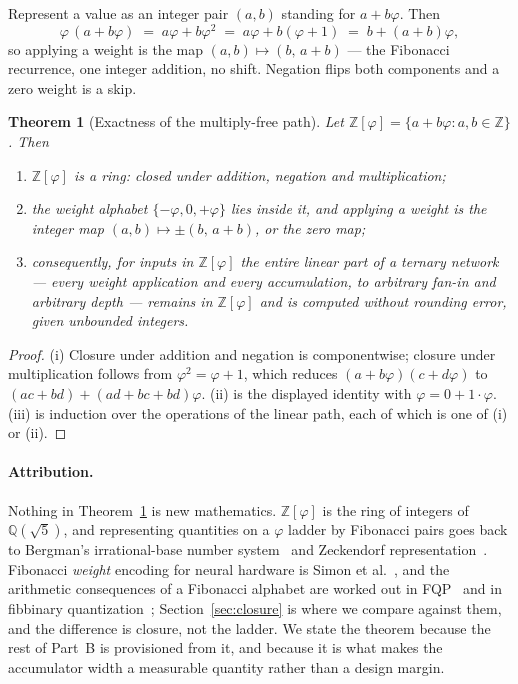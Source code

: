 \documentclass[11pt]{article}
\newtheorem{theorem}{Theorem}
\theoremstyle{definition}
\begin{document}
Represent a value as an integer pair $(a,b)$ standing for $a + b\varphi$. Then
\[
  \varphi\,(a + b\varphi) \;=\; a\varphi + b\varphi^{2} \;=\; a\varphi + b(\varphi+1)
  \;=\; b + (a+b)\varphi ,
\]
so applying a weight is the map $(a,b) \mapsto (b,\,a+b)$ --- the Fibonacci
recurrence, one integer addition, no shift. Negation flips both components and a
zero weight is a skip.

\begin{theorem}[Exactness of the multiply-free path]
\label{thm:exact}
Let $\mathbb{Z}[\varphi] = \{a + b\varphi : a,b \in \mathbb{Z}\}$. Then
\begin{enumerate}[label=(\roman*),topsep=2pt,itemsep=1pt]
\item $\mathbb{Z}[\varphi]$ is a ring: closed under addition, negation and
      multiplication;
\item the weight alphabet $\{-\varphi,0,+\varphi\}$ lies inside it, and applying
      a weight is the integer map $(a,b) \mapsto \pm(b,\,a+b)$, or the zero map;
\item consequently, for inputs in $\mathbb{Z}[\varphi]$ the entire linear part of
      a ternary network --- every weight application and every accumulation, to
      arbitrary fan-in and arbitrary depth --- remains in $\mathbb{Z}[\varphi]$
      and is computed without rounding error, given unbounded integers.
\end{enumerate}
\end{theorem}
\begin{proof}
(i) Closure under addition and negation is componentwise; closure under
multiplication follows from $\varphi^{2} = \varphi + 1$, which reduces
$(a+b\varphi)(c+d\varphi)$ to $(ac+bd) + (ad+bc+bd)\varphi$. (ii) is the
displayed identity with $\varphi = 0 + 1\!\cdot\!\varphi$. (iii) is induction over
the operations of the linear path, each of which is one of (i) or (ii).
\end{proof}

\paragraph{Attribution.} Nothing in Theorem~\ref{thm:exact} is new mathematics.
$\mathbb{Z}[\varphi]$ is the ring of integers of $\mathbb{Q}(\sqrt5)$, and
representing quantities on a $\varphi$ ladder by Fibonacci pairs goes back to
Bergman's irrational-base number system~\cite{bergman1957} and Zeckendorf
representation~\cite{zeckendorf1972}. Fibonacci \emph{weight} encoding for neural
hardware is Simon et al.~\cite{simon}, and the arithmetic consequences of a
Fibonacci alphabet are worked out in FQP~\cite{fqp} and in fibbinary
quantization~\cite{fibbinary}; Section~\ref{sec:closure} is where we compare
against them, and the difference is closure, not the ladder. We state the
theorem because the rest of Part~B is provisioned from it, and because it is what
makes the accumulator width a measurable quantity rather than a design margin.
\end{document}
